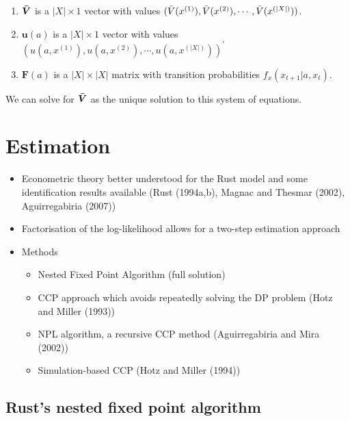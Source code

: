 \documentclass[11pt]{article}
\begin{document}
\begin{itemize}
    \begin{enumerate}
        \item $\bm{\Bar{V}}$ is a $|X| \times 1$ vector with values $(\Bar{V}(x^{(1)}),\Bar{V}(x^{(2)}),\cdots,\Bar{V}(x^{(|X|)}))$.
        \item $\bm{u}(a)$ is a $|X| \times 1$ vector with values $(u(a,x^{(1)}),u(a,x^{(2)}),\cdots,u(a,x^{(|X|)}))^\prime$
        \item $\bm{F}(a)$ is a $|X| \times |X|$ matrix with transition probabilities $f_x(x_{t+1}|a,x_t)$.
    \end{enumerate}
    We can solve for $\bm{\Bar{V}}$ as the unique solution to this system of equations.
\end{itemize}

\section{Estimation}
\begin{itemize}
    \item Econometric theory better understood for the Rust model and some identification results available (Rust (1994a,b), Magnac and Thesmar (2002), Aguirregabiria (2007))
    \item Factorisation of the log-likelihood allows for a two-step estimation approach
    \item Methods
    \begin{itemize}
        \item Nested Fixed Point Algorithm (full solution)
        \item CCP approach which avoids repeatedly solving the DP problem (Hotz and Miller (1993))
        \item NPL algorithm, a recursive CCP method (Aguirregabiria and Mira (2002))
        \item Simulation-based CCP (Hotz and Miller (1994))
    \end{itemize}
\end{itemize}

\subsection{Rust's nested fixed point algorithm}
\end{document}

